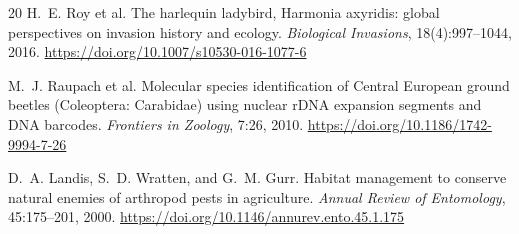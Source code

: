 \documentclass[10pt,letterpaper]{article}
\begin{document}
\begin{thebibliography}{20}
H.~E. Roy et al.
\newblock The harlequin ladybird, Harmonia axyridis: global perspectives on invasion history and ecology.
\newblock \emph{Biological Invasions}, 18(4):997--1044, 2016. \url{https://doi.org/10.1007/s10530-016-1077-6}

M.~J. Raupach et al.
\newblock Molecular species identification of Central European ground beetles (Coleoptera: Carabidae) using nuclear rDNA expansion segments and DNA barcodes.
\newblock \emph{Frontiers in Zoology}, 7:26, 2010. \url{https://doi.org/10.1186/1742-9994-7-26}

D.~A. Landis, S.~D. Wratten, and G.~M. Gurr.
\newblock Habitat management to conserve natural enemies of arthropod pests in agriculture.
\newblock \emph{Annual Review of Entomology}, 45:175--201, 2000. \url{https://doi.org/10.1146/annurev.ento.45.1.175}
\end{thebibliography}
\end{document}
